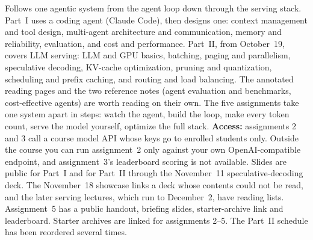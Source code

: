 \documentclass[10pt,oneside]{report}
\begin{document}
Follows one agentic system from the agent loop down through the serving stack.
Part~I uses a coding agent (Claude Code), then designs one: context management and tool design, multi-agent architecture and communication, memory and reliability, evaluation, and cost and performance. Part~II, from October~19, covers LLM serving: LLM and GPU basics, batching, paging and parallelism, speculative decoding, KV-cache optimization, pruning and quantization, scheduling and prefix caching, and routing and load balancing.
The annotated reading pages and the two reference notes (agent evaluation and benchmarks, cost-effective agents) are worth reading on their own.
The five assignments take one system apart in steps: watch the agent, build the loop, make every token count, serve the model yourself, optimize the full stack.
\textbf{Access:} assignments 2 and 3 call a course model API whose keys go to enrolled students only. Outside the course you can run assignment~2 only against your own OpenAI-compatible endpoint, and assignment~3's leaderboard scoring is not available.
Slides are public for Part~I and for Part~II through the November~11 speculative-decoding deck. The November~18 showcase links a deck whose contents could not be read, and the later serving lectures, which run to December~2, have reading lists. Assignment~5 has a public handout, briefing slides, starter-archive link and leaderboard. Starter archives are linked for assignments 2--5. The Part~II schedule has been reordered several times.
\end{document}
